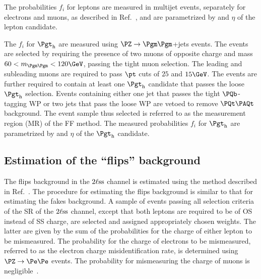 The probabilities $f_{i}$ for leptons are measured in multijet events, separately for electrons and muons, as described in Ref.~\cite{Sirunyan:2020icl},
and are parametrized by \pt and $\eta$ of the lepton candidate.

The $f_{i}$ for $\tauh$ are measured using $\Zmm$+jets events.
The events are selected by requiring the presence of two muons of opposite charge and mass $60 < m_{\Pgm\Pgm} < 120\GeV$,
passing the tight muon selection.
The leading and subleading muons are required to pass $\pt$ cuts of $25$ and $15\GeV$.
The events are further required to contain at least one $\tauh$ candidate that passes the loose $\tauh$ selection.
Events containing either one jet that passes the tight $\Pbottom$-tagging WP or two jets that pass the loose WP are vetoed to remove $\ttbar$ background.
The event sample thus selected is referred to as the measurement region (MR) of the FF method.
The measured probabilities $f_{i}$ for $\tauh$ are parametrized by \pt and $\eta$ of the $\tauh$ candidate.


\subsection{Estimation of the ``flips'' background}
\label{sec:backgroundEstimation_flips}

The flips background in the $2\ell\text{ss}$ channel is estimated using the method described in Ref.~\cite{Sirunyan:2020icl}.
The procedure for estimating the flips background is similar to that for estimating the fakes background.
A sample of events passing all selection criteria of the SR of the $2\ell\text{ss}$ channel, 
except that both leptons are required to be of OS instead of SS charge, 
are selected and assigned appropriately chosen weights.
The latter are given by the sum of the probabilities for the charge of either lepton to be mismeasured.
The probability for the charge of electrons to be mismeasured, referred to as the electron charge misidentification rate,
is determined using $\Zee$ events.
The probability for mismeasuring the charge of muons is negligible~\cite{Sirunyan:2020icl}.
